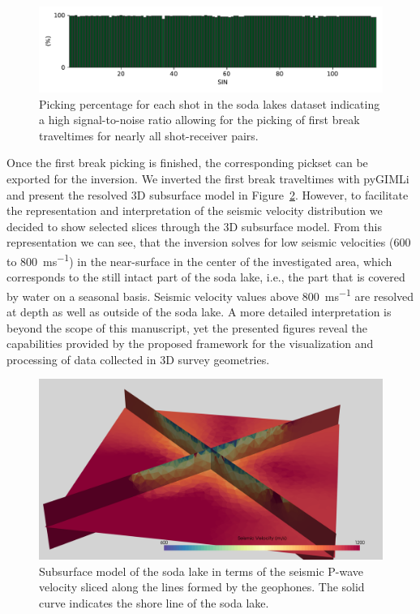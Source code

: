\documentclass[a4paper,fleqn]{cas-sc}
\begin{document}
\begin{figure}
	\centering
	\includegraphics[width=.75\textwidth]{figures/3d_pickperc.pdf}
	\caption{Picking percentage for each shot in the soda lakes dataset indicating a high signal-to-noise ratio allowing for the picking of first break traveltimes for nearly all shot-receiver pairs.}
	\label{fig:3d_pickperc}
\end{figure}

Once the first break picking is finished, the corresponding pickset can be exported for the inversion. We inverted the first break traveltimes with pyGIMLi and present the resolved 3D subsurface model in Figure~\ref{fig:3dinvres}. However, to facilitate the representation and interpretation of the seismic velocity distribution we decided to show selected slices through the 3D subsurface model. From this representation we can see, that the inversion solves for low seismic velocities (\num{600} to \qty{800}{ms^{-1}}) in the near-surface in the center of the investigated area, which corresponds to the still intact part of the soda lake, i.e., the part that is covered by water on a seasonal basis. Seismic velocity values above \qty{800}{ms^{-1}} are resolved at depth as well as outside of the soda lake. A more detailed interpretation is beyond the scope of this manuscript, yet the presented figures reveal the capabilities provided by the proposed framework for the visualization and processing of data collected in 3D survey geometries.

\begin{figure}
	\centering
	\includegraphics[width=.75\textwidth]{figures/inv_l100_ae0.0035.png}
	\caption{Subsurface model of the soda lake in terms of the seismic P-wave velocity sliced along the lines formed by the geophones. The solid curve indicates the shore line of the soda lake.}
	\label{fig:3dinvres}
\end{figure}
\end{document}
